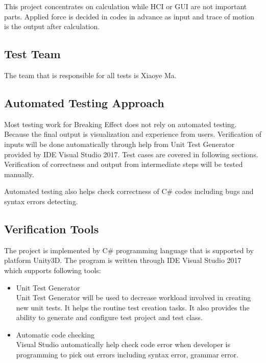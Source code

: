 \documentclass[12pt, titlepage]{article}
\begin{document}
This project concentrates on calculation while
HCI or GUI are not important parts. Applied force is decided in codes in advance as input
and trace of motion is the output after calculation.

\subsection{Test Team}
The team that is responsible for all tests is Xiaoye Ma.
\subsection{Automated Testing Approach}

Most testing work for Breaking Effect does not rely on automated testing. Because the final output is visualization and experience from users. Verification of inputs will be done automatically through help from Unit Test Generator provided by IDE Visual Studio 2017. Test cases are covered in following sections. Verification of correctness and output from intermediate steps will be tested manually.  

Automated testing also helps check correctness of C$\#$ codes including bugs and syntax errors detecting.
 
\subsection{Verification Tools}

The project is implemented by C$\#$ programming language that is supported by platform Unity3D. The program is written through IDE Visual Studio 2017 which supports following tools:

\begin{itemize}
	\item Unit Test Generator\\
	
	Unit Test Generator will be used to decrease workload involved in creating new unit tests. It helps the routine test creation tasks. It also provides the ability to generate and configure test project and test class. 
	
\end{itemize}

\begin{itemize}
	\item Automatic code checking\\
	
	Visual Studio automatically help check code error when developer is programming to pick out errors including syntax error, grammar error. 	
\end{itemize}
		
\end{document}
